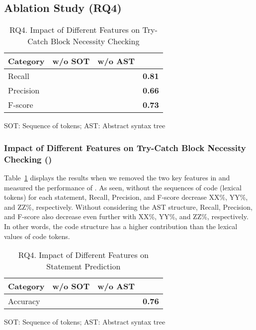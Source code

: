 \subsection{Ablation Study (RQ4)}
\label{sec:rq4}



\begin{table}[h]
  \caption{RQ4. Impact of Different Features on Try-Catch Block Necessity Checking}
  \vspace{-12pt}
	\begin{center}
		\renewcommand{\arraystretch}{1}
		\begin{tabular}{p{1.75cm}<{\centering}|p{1.75cm}<{\centering}|p{1.75cm}<{\centering}|p{1.75cm}<{\centering}}
			\hline
			Category  & \tool w/o SOT & \tool w/o AST & \tool \\
			\hline
			Recall    & & & \textbf{0.81} \\
			Precision & & &\textbf{0.66} \\
			F-score   & & &\textbf{0.73} \\
			\hline
		\end{tabular}
		SOT: Sequence of tokens; AST: Abstract syntax tree
		\label{tab:sensi-xblock}
	\end{center}
\end{table}

\subsubsection{Impact of Different Features on Try-Catch Block Necessity Checking ({\xblock})}

Table~\ref{tab:sensi-xblock} displays the results when we removed the
two key features in {\tool} and measured the performance of {\xblock}.
As seen, without the sequences of code (lexical tokens) for each
statement, Recall, Precision, and F-score decrease XX\%, YY\%, and
ZZ\%, respectively. Without considering the AST structure, Recall,
Precision, and F-score also decrease even further with XX\%, YY\%, and
ZZ\%, respectively. In other words, the code structure has a higher
contribution than the lexical values of code tokens.



\begin{table}[h]
	\caption{RQ4. Impact of Different Features on  Statement Prediction}
	\begin{center}
		\renewcommand{\arraystretch}{1}
		\begin{tabular}{p{1.75cm}<{\centering}|p{1.75cm}<{\centering}|p{1.75cm}<{\centering}|p{1.75cm}<{\centering}}
			\hline
			Category  & \tool w/o SOT & \tool w/o AST & \tool \\
			\hline
			Accuracy    & & & \textbf{0.76} \\
			\hline
		\end{tabular}
		SOT: Sequence of tokens; AST: Abstract syntax tree
		\label{tab:sensi-xstate}
	\end{center}
\end{table}

